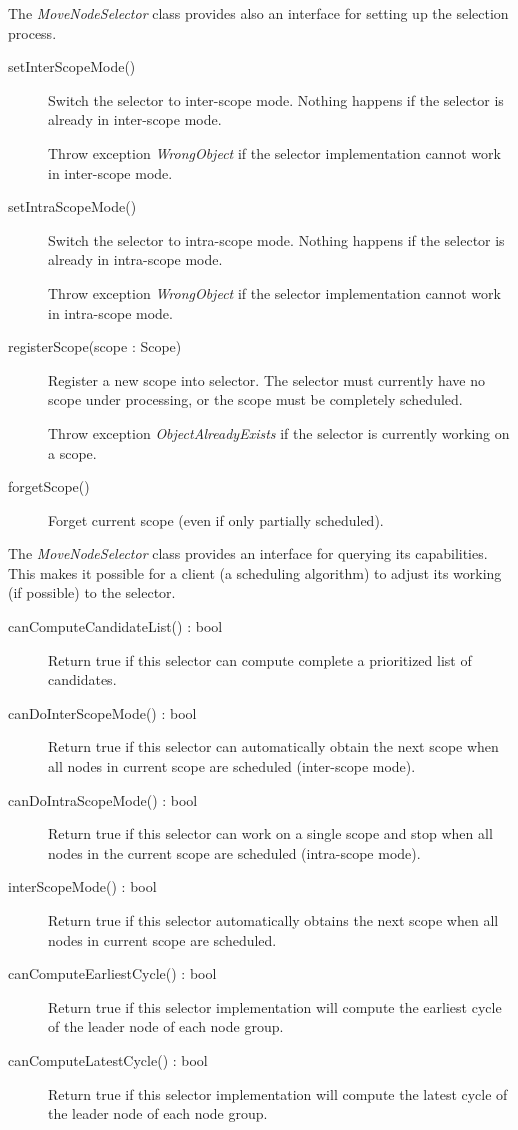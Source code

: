 \documentclass[a4paper,twoside]{tce}
\begin{document}
The \emph{MoveNodeSelector} class provides also an interface for setting up the
selection process.
%
\begin{description}
\item[setInterScopeMode()]%
  Switch the selector to inter-scope mode. Nothing happens if the selector
  is already in inter-scope mode.

  Throw exception \emph{WrongObject}
%
%
  if the selector implementation cannot work in inter-scope mode.

\item[setIntraScopeMode()]%
  Switch the selector to intra-scope mode. Nothing happens if the selector
  is already in intra-scope mode.

  Throw exception \emph{WrongObject}
%
%
  if the selector implementation cannot work in intra-scope mode.

\item[registerScope(scope : Scope)]%
  Register a new scope into selector. The selector must currently have no
  scope under processing, or the scope must be completely scheduled.

  Throw exception \emph{ObjectAlreadyExists} if the selector is currently
  working on a scope.

\item[forgetScope()]%
  Forget current scope (even if only partially scheduled).
\end{description}

The \emph{MoveNodeSelector} class provides an interface for querying its
capabilities. This makes it possible for a client (a scheduling algorithm)
to adjust its working (if possible) to the selector.
\begin{description}
\item[canComputeCandidateList() : bool]%
  Return true if this selector can compute complete a prioritized list of
  candidates.
\item[canDoInterScopeMode() : bool]%
  Return true if this selector can automatically obtain the next scope when
  all nodes in current scope are scheduled (inter-scope mode).
\item[canDoIntraScopeMode() : bool]%
  Return true if this selector can work on a single scope and stop when all
  nodes in the current scope are scheduled (intra-scope mode).
\item[interScopeMode() : bool]%
  Return true if this selector automatically obtains the next scope when all
  nodes in current scope are scheduled.
\item[canComputeEarliestCycle() : bool]%
  Return true if this selector implementation will compute the earliest
  cycle of the leader node of each node group.
\item[canComputeLatestCycle() : bool]%
  Return true if this selector implementation will compute the latest cycle
  of the leader node of each node group.
\end{description}
\end{document}

